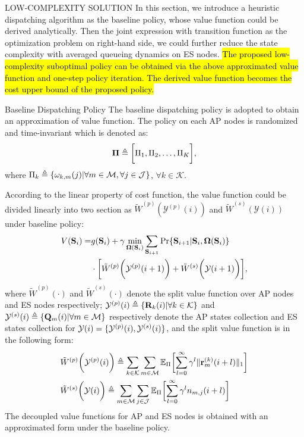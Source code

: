 \documentclass[10pt, conference, letterpaper]{IEEEtran}
\newcommand{\mat}{\mathbf}
\newcommand{\define}{\triangleq}
\renewcommand{\vec}{\mathbf}
\DeclarePairedDelimiter{\set}{\{}{\}}
\DeclarePairedDelimiter{\Inorm}{\|}{\|_1}
\DeclarePairedDelimiter{\Paren}{\bigg(}{\bigg)}
\DeclarePairedDelimiter{\Bracket}{\bigg[}{\bigg]}
\newcommand{\apSet}{\mathcal{K}}
\newcommand{\esSet}{\mathcal{M}}
\newcommand{\jSpace}{\mathcal{J}}
\newcommand{\Stat}{\mathbf{S}}
\newcommand{\Obsv}{\mathcal{Y}}
\newcommand{\Policy}{\mathbf{\Omega}}
\begin{document}
    \begin{section}{LOW-COMPLEXITY SOLUTION}
        \label{sec:algorithm}
        In this section, we introduce a heuristic dispatching algorithm as the baseline policy, whose value function could be derived analytically. Then the joint expression with transition function as the optimization problem on right-hand side, we could further reduce the state complexity with averaged queueing dynamics on ES nodes.
        \hl{The proposed low-complexity suboptimal policy can be obtained via the above approximated value function and one-step policy iteration. The derived value function becomes the cost upper bound of the proposed policy.}

        \begin{subsection}{Baseline Dispatching Policy}
            The baseline dispatching policy is adopted to obtain an approximation of value function. The policy on each AP nodes is randomized and time-invariant which is denoted as:
            \begin{align}
                \vec{\Pi} \define \Bracket{\Pi_1, \Pi_2, \dots, \Pi_K},
            \end{align}
            where $\Pi_k \define \set{\omega_{k,m}(j)|\forall m\in\esSet,\forall j\in\jSpace}$, $\forall k\in\apSet$.

            According to the linear property of cost function, the value function could be divided linearly into two section as $\tilde{W}^{(p)}(\Obsv^{(p)}(i))$ and $\tilde{W}^{(s)}(\Obsv(i))$ under baseline policy:
            \begin{align}
                V(\Stat_{i}) =& 
                    g(\Stat_{i}) + \gamma \min_{\Policy(\Stat_{i})} \sum_{\Stat_{i+1}} \Pr\{ \Stat_{i+1}|\Stat_{i}, \Policy(\Stat_{i}) \}
                    \nonumber\\
                    & \cdot \Bracket{ \tilde{W}^{(p)}\Paren{\Obsv^{(p)}(i+1)} + \tilde{W}^{(s)}\Paren{\Obsv(i+1)} },
            \end{align}
            where $\tilde{W}^{(p)}(\cdot)$ and $\tilde{W}^{(s)}(\cdot)$ denote the split value function over AP nodes and ES nodes respectively; $\Obsv^{(p)}(i) \define \set{\mat{R}_k(i)|\forall k\in\apSet}$ and $\Obsv^{(s)}(i) \define \set{\vec{Q}_m(i)|\forall m\in\esSet}$ respectively denote the AP states collection and ES states collection for $\Obsv(i) = \set{\Obsv^{(p)}(i), \Obsv^{(s)}(i)}$, and the split value function is in the following form:
            \begin{align}
                &\tilde{W}^{(p)}\Paren{\Obsv^{(p)}(i)} \define \sum_{k\in\apSet}\sum_{m\in\esSet}
                    \mathbb{E}_{\Pi}\Bracket{\sum_{l=0}^{\infty} \gamma^{l} \Inorm{\vec{r}^{(k)}_{m}(i+l)}}
                \\
                &\tilde{W}^{(s)}\Paren{\Obsv(i)} \define \sum_{m\in\esSet} \sum_{j\in\jSpace}
                    \mathbb{E}_{\Pi}\Bracket{\sum_{l=0}^{\infty} \gamma^{l} n_{m,j}(i+l)}
            \end{align}
            The decoupled value functions for AP and ES nodes is obtained with an approximated form under the baseline policy.


\end{subsection}
\end{section}
\end{document}
